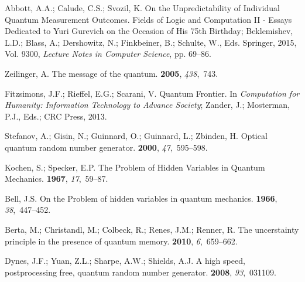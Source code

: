 \documentclass[information,article,submit,moreauthors,pdftex,12pt,a4paper]{mdpi}
\theoremstyle{mdpi}
\newcounter{ex}
\newcounter{re}
\theoremstyle{mdpidefinition}
\begin{document}
\begin{thebibliography}{-------}
\providecommand{\natexlab}[1]{#1}

Abbott, A.A.; Calude, C.S.; Svozil, K.
\newblock On the Unpredictability of Individual Quantum Measurement Outcomes.
\newblock  Fields of Logic and Computation {II} - Essays Dedicated to Yuri
  Gurevich on the Occasion of His 75th Birthday; Beklemishev, L.D.; Blass, A.;
  Dershowitz, N.; Finkbeiner, B.; Schulte, W., Eds. Springer,  2015, Vol. 9300,
  {\em Lecture Notes in Computer Science}, pp. 69--86.

Zeilinger, A.
\newblock The message of the quantum.
 {\bf 2005}, {\em 438},~743.

Fitzsimons, J.F.; Rieffel, E.G.; Scarani, V.
\newblock Quantum Frontier. In {\em Computation for Humanity: Information
  Technology to Advance Society}; Zander, J.; Mosterman, P.J., Eds.; CRC Press,
   2013.

Stefanov, A.; Gisin, N.; Guinnard, O.; Guinnard, L.; Zbinden, H.
\newblock Optical quantum random number generator.
 {\bf 2000}, {\em 47},~595--598.

Kochen, S.; Specker, E.P.
\newblock The Problem of Hidden Variables in Quantum Mechanics.
 {\bf 1967}, {\em 17},~59--87.

Bell, J.S.
\newblock On the Problem of hidden variables in quantum mechanics.
 {\bf 1966}, {\em 38},~447--452.

Berta, M.; Christandl, M.; Colbeck, R.; Renes, J.M.; Renner, R.
\newblock The uncerstainty principle in the presence of quantum memory.
 {\bf 2010}, {\em 6},~659--662.

Dynes, J.F.; Yuan, Z.L.; Sharpe, A.W.; Shields, A.J.
\newblock A high speed, postprocessing free, quantum random number generator.
 {\bf 2008}, {\em 93},~031109.


\end{thebibliography}
\end{document}
